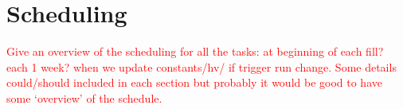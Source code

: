 \section{Scheduling}
\textcolor{red}{ Give an overview of the scheduling for all the tasks: at beginning of each fill? each 1 week?
when we update constants/hv/ if trigger run change. Some details could/should included in each section but probably it would be good to have some `overview' of the schedule.}
